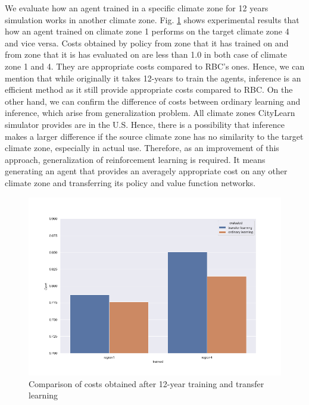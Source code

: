 \documentclass{article}
\begin{document}
We evaluate how an agent trained in a specific climate zone for 12 years simulation works in another climate zone. Fig. \ref{fig:transfer_learning_result} shows experimental results that how an agent trained on climate zone 1 performs on the target climate zone 4 and vice versa. Costs obtained by policy from zone that it has trained on and from zone that it is has evaluated on are less than 1.0 in both case of climate zone 1 and 4. They are appropriate costs compared to RBC's ones. Hence, we can mention that while originally it takes 12-years to train the agents, inference is an efficient method as it still provide appropriate costs compared to RBC. On the other hand, we can confirm the difference of costs between ordinary learning and inference, which arise from generalization problem. All climate zones CityLearn simulator provides are in the U.S. Hence, there is a possibility that inference makes a larger difference if the source climate zone has no similarity to the target climate zone, especially in actual use. Therefore, as an improvement of this approach, generalization of reinforcement learning is required. It means generating an agent that provides an averagely appropriate cost on any other climate zone and transferring its policy and value function networks.

\begin{figure}[htbp!]
\centering
\label{fig:transfer_learning_result}
\includegraphics[scale=0.3]{figures/transfer_learning_result.png}
\caption{Comparison of costs obtained after 12-year training and transfer learning}
\end{figure}
\end{document}
